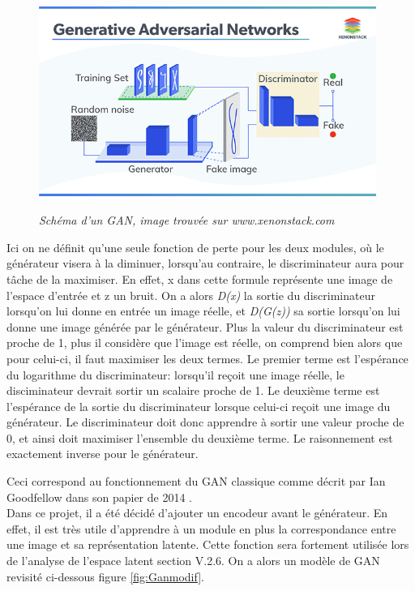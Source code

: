 \documentclass[12pt, oneside, a4paper, titlepage]{article}
\begin{document}
\begin{figure}
    \centering
    \includegraphics[width=11cm, height=7cm]{generative-adversarial-networks-applications-xenonstack.png}
    \caption{\textit{Schéma d'un GAN, image trouvée sur www.xenonstack.com}}
    \label{fig:GAN}
\end{figure}


Ici on ne définit qu'une seule fonction de perte pour les deux modules, où le générateur visera à la diminuer, lorsqu'au contraire, le discriminateur aura pour tâche de la maximiser.
 En effet, x dans cette formule représente une image de l'espace d'entrée et z un bruit.
 On a alors \textit{D(x) } la sortie du discriminateur lorsqu'on lui donne en entrée un image réelle, et \textit{D(G(z))} sa sortie lorsqu'on lui donne une image générée par le générateur. Plus la valeur du discriminateur est proche de 1, plus il considère que l'image est réelle, on comprend bien alors que pour celui-ci, il faut maximiser les deux termes.
Le premier terme est l'espérance du logarithme du discriminateur: lorsqu'il reçoit une image réelle, le disciminateur devrait sortir un scalaire proche de 1. Le deuxième terme est l'espérance de la sortie du discriminateur lorsque celui-ci reçoit une image du générateur. Le discriminateur doit donc apprendre à sortir une valeur proche de 0, et ainsi doit maximiser l'ensemble du deuxième terme. Le raisonnement est exactement inverse pour le générateur.

Ceci correspond au fonctionnement du GAN classique comme décrit par Ian Goodfellow dans son papier de 2014 \cite{goodfellow_generative_2014}.\\

Dans ce projet, il a été décidé d'ajouter un encodeur avant le générateur. En effet, il est très utile d'apprendre à un module en plus la correspondance entre une image et sa représentation latente. Cette fonction sera fortement utilisée lors de l'analyse de l'espace latent section V.2.6. On a alors un modèle de GAN revisité ci-dessous figure \ref{fig:Ganmodif}.
\end{document}
